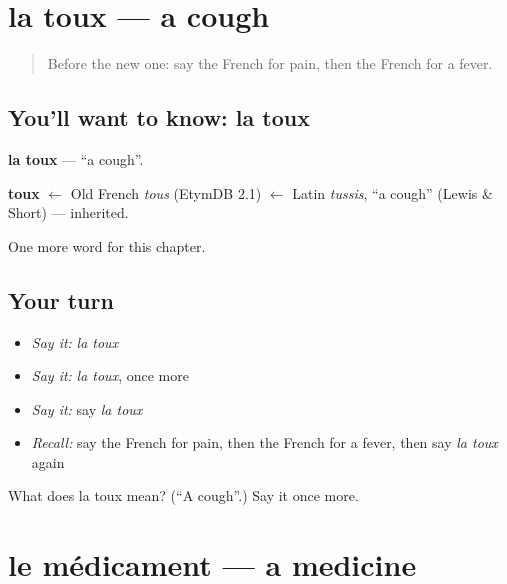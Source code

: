 \section[la toux]{la toux — a cough}

\label{lesson:FR-C53-toux}



\begin{quote}
Before the new one: say the French for pain, then the French for a fever.
\end{quote}

\subsection*{You'll want to know: la toux}
\textbf{la toux} — \textquotedblleft{}a cough\textquotedblright{}.

\begin{cousinweb}
\textbf{toux} $\leftarrow$ Old French \emph{tous} (EtymDB 2.1) $\leftarrow$ Latin \emph{tussis}, \textquotedblleft{}a cough\textquotedblright{} (Lewis \& Short) — inherited.
\end{cousinweb}

\begin{grammarlens}[title={What you've built}]
One more word for this chapter.
\end{grammarlens}

\subsection*{Your turn}
\begin{itemize}
\raggedright
  \item \emph{Say it:} \emph{la toux}
  \item \emph{Say it:} \emph{la toux}, once more
  \item \emph{Say it:} say \emph{la toux}
  \item \emph{Recall:} say the French for pain, then the French for a fever, then say \emph{la toux} again
\end{itemize}

\begin{tcolorbox}[breakable,colback=teal!4,colframe=teal!35!black,title={Before you move on}]
What does la toux mean? (\textquotedblleft{}A cough\textquotedblright{}.) Say it once more.
\end{tcolorbox}
\section[le médicament]{le médicament — a medicine}

